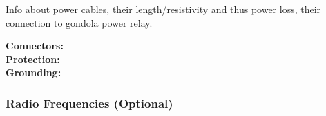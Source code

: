 Info about power cables, their length/resistivity and thus power loss, their connection to gondola power relay.



\textbf{Connectors:}\\

\textbf{Protection:}\\

\textbf{Grounding:}\\


\subsubsection{Radio Frequencies (Optional)}



\raggedbottom
